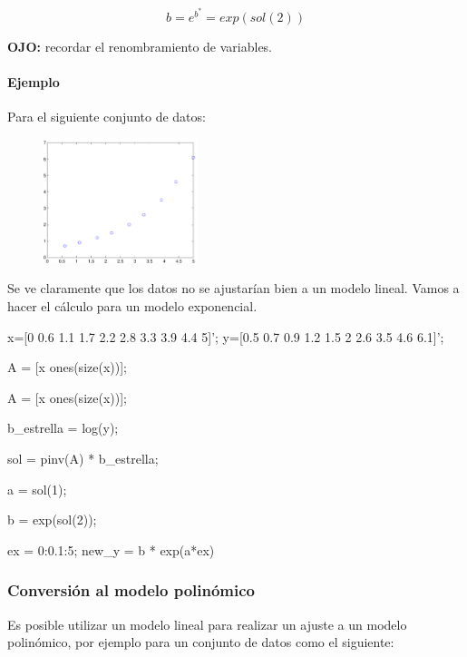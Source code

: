 \documentclass[11pt]{scrartcl}
\begin{document}
\[
b = e^{b^*} = exp(sol(2))
\]

\textbf{OJO:} recordar el renombramiento de variables.

\paragraph{Ejemplo}

Para el siguiente conjunto de datos:

\begin{figure}[h!]
  \centering
  \includegraphics[width=0.4\textwidth]{img/modeloexponencial_1}
\end{figure}

Se ve claramente que los datos no se ajustarían bien a un modelo lineal. Vamos a
hacer el cálculo para un modelo exponencial.

\begin{matlabcode}
x=[0 0.6 1.1 1.7 2.2 2.8 3.3 3.9 4.4 5]';
y=[0.5 0.7 0.9 1.2 1.5 2 2.6 3.5 4.6 6.1]';

A = [x ones(size(x))];  

A = [x ones(size(x))];

b_estrella = log(y);

sol = pinv(A) * b_estrella;

a = sol(1);

b = exp(sol(2));

ex = 0:0.1:5;
new_y = b * exp(a*ex)

\end{matlabcode}

\subsubsection{Conversión al modelo polinómico}

Es posible utilizar un modelo lineal para realizar un ajuste a un modelo
polinómico, por ejemplo para un conjunto de datos como el siguiente:
\end{document}
